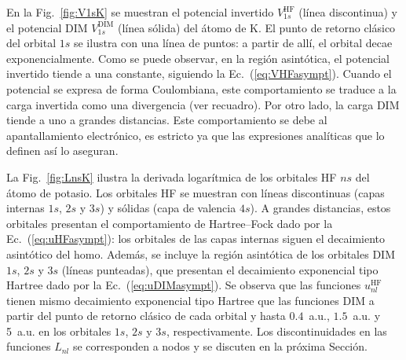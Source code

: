 En la Fig.~\ref{fig:V1sK} se muestran el potencial invertido 
$V_{1s}^{\mathrm{HF}}$ (línea discontinua) y el potencial DIM 
$V_{1s}^{\mathrm{DIM}}$ (línea sólida) del átomo de K. El punto de 
retorno clásico del orbital $1s$ se ilustra con una línea de puntos: a 
partir de allí, el orbital decae exponencialmente. Como se puede 
observar, en la región asintótica, el potencial invertido tiende a una 
constante, siguiendo la Ec.~(\ref{eq:VHFasympt}). Cuando el potencial se 
expresa de forma Coulombiana, este comportamiento se traduce a la carga 
invertida como una divergencia (ver recuadro). Por otro lado, la carga 
DIM tiende a uno a grandes distancias. Este comportamiento se debe al 
apantallamiento electrónico, es estricto ya que las expresiones 
analíticas que lo definen así lo aseguran. 

La Fig.~\ref{fig:LnsK} ilustra la derivada logarítmica de los orbitales 
HF $ns$ del átomo de potasio. Los orbitales HF se muestran con líneas 
discontinuas (capas internas $1s$, $2s$ y $3s$) y sólidas (capa de 
valencia $4s$). A grandes distancias, estos orbitales presentan el 
comportamiento de Hartree--Fock dado por la Ec.~(\ref{eq:uHFasympt}): 
los orbitales de las capas internas siguen el decaimiento asintótico del 
\acs{homo}. Además, se incluye la región asintótica de los orbitales DIM 
$1s$, $2s$ y $3s$ (líneas punteadas), que presentan el decaimiento 
exponencial tipo Hartree dado por la Ec.~(\ref{eq:uDIMasympt}).
Se observa que las funciones $u_{nl}^{\mathrm{HF}}$ tienen mismo 
decaimiento exponencial tipo Hartree que las funciones DIM a partir del 
punto de retorno clásico de cada orbital y hasta $0.4$~a.u., $1.5$~a.u. 
y 5~a.u. en los orbitales $1s$, $2s$ y $3s$, respectivamente. Los 
discontinuidades en las funciones $L_{nl}$ se corresponden a nodos y se 
discuten en la próxima Sección.



